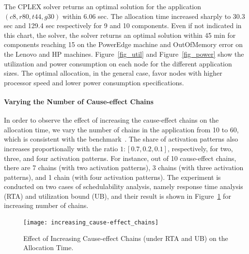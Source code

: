 The CPLEX solver returns an optimal solution for the application $(c8, r80,t44,g30)$ within 6.06 sec. The allocation time increased sharply to 30.3 sec and 129.4 sec respectively for 9 and 10 components. Even if not indicated in this chart, the solver, the solver returns an optimal solution within 45 min for components reaching 15 on the PowerEdge machine and OutOfMemory error on the Lenovo and HP machines. Figure~\ref{fig_util} and Figure~\ref{fig_power} show the utilization and power consumption on each node for the different application sizes. The optimal allocation, in the general case, favor nodes with higher processor speed and lower power consumption specifications.

\paragraph{Varying the Number of Cause-effect Chains} 
In order to observe the effect of increasing the cause-effect chains on the allocation time, we vary the number of chains in the application from 10 to 60, which is consistent with the benchmark~\cite{Kramer2015RealFree}. The share of activation patterns also increases proportionally with the ratio $1:[0.7, 0.2, 0.1]$, respectively, for two, three, and four activation patterns. For instance, out of 10 cause-effect chains, there are 7 chains (with two activation patterns), 3 chains (with three activation patterns), and 1 chain (with four activation patterns). The experiment is conducted on two cases of schedulability analysis, namely response time analysis (RTA) and utilization bound (UB), and their result is shown in  Figure~\ref{chart_cause_effect_chain} for increasing number of chains.
\begin{figure}[h!]
\centering
\texttt{[image: increasing\_cause-effect\_chains]}
\caption{Effect of Increasing Cause-effect Chains (under RTA and UB) on the Allocation Time.}
\label{chart_cause_effect_chain}\vspace{-0.4cm}
\end{figure}

